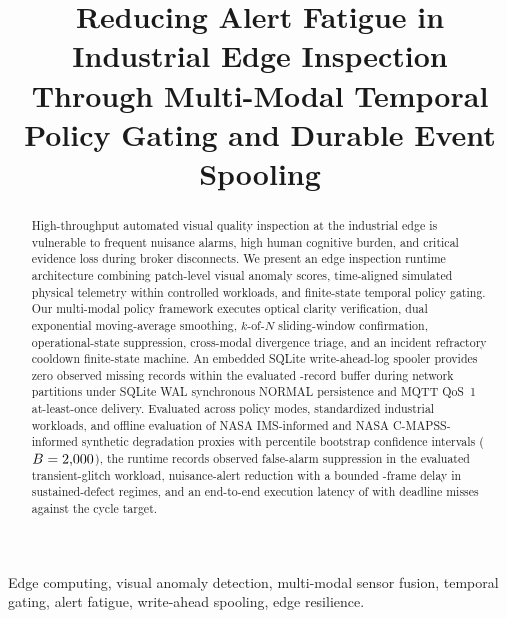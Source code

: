 \documentclass[conference]{IEEEtran}
\begin{document}
\title{Reducing Alert Fatigue in Industrial Edge Inspection Through Multi-Modal Temporal Policy Gating and Durable Event Spooling}

\author{
}

\maketitle

\begin{abstract}
High-throughput automated visual quality inspection at the industrial edge is vulnerable to frequent nuisance alarms, high human cognitive burden, and critical evidence loss during broker disconnects. We present an edge inspection runtime architecture combining patch-level visual anomaly scores, time-aligned simulated physical telemetry within controlled workloads, and finite-state temporal policy gating. Our multi-modal policy framework executes optical clarity verification, dual exponential moving-average smoothing, $k$-of-$N$ sliding-window confirmation, operational-state suppression, cross-modal divergence triage, and an incident refractory cooldown finite-state machine. An embedded SQLite write-ahead-log spooler provides zero observed missing records within the evaluated \SpoolBufferCapacity{}-record buffer during network partitions under SQLite WAL synchronous NORMAL persistence and MQTT QoS~1 at-least-once delivery. Evaluated across \TotalPolicyModes{} policy modes, \TotalWorkloadScenarios{} standardized industrial workloads, and offline evaluation of NASA IMS-informed and NASA C-MAPSS-informed synthetic degradation proxies with percentile bootstrap confidence intervals ($B = 2{,}000{}$), the runtime records observed \GlitchSuppressionFull{} false-alarm suppression in the evaluated transient-glitch workload, \SustainedSuppressionFull{} nuisance-alert reduction with a bounded \SustainedMedianDelay{}-frame delay in sustained-defect regimes, and an end-to-end execution latency of \MeanPipelineLatency{} with \DeadlineMissRate{} deadline misses against the \TargetDeadlineMs{} cycle target.
\end{abstract}

\begin{IEEEkeywords}
Edge computing, visual anomaly detection, multi-modal sensor fusion, temporal gating, alert fatigue, write-ahead spooling, edge resilience.
\end{IEEEkeywords}
\end{document}
